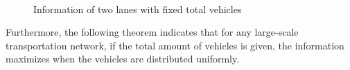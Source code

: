 \documentclass[preprint,authoryear,12pt]{elsarticle}
\begin{document}
\begin{figure}[ht]
  \centering
  \\
  \caption{Information of two lanes with fixed total vehicles}
  \label{fig:info_twolane}
\end{figure}

Furthermore, the following theorem indicates that for any large-scale transportation network, if the total amount of vehicles is given, the information maximizes when the vehicles are distributed uniformly.
\end{document}
